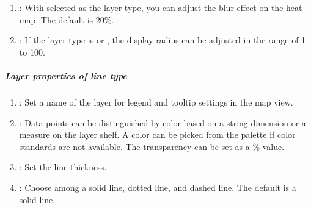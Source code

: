 \documentclass[letterpaper,10pt,english]{sphinxmanual}
\begin{document}
\begin{enumerate}
\item {} 
: With  selected as the layer type, you can adjust the blur effect on the heat map. The default is 20\%.

\item {} 
: If the layer type is  or , the display radius can be adjusted in the range of 1 to 100.

\end{enumerate}


\subparagraph{Layer properties of line type}
\label{\detokenize{discovery/part04/map_chart:line}}\begin{quote}

\begin{figure}[H]
\centering

\noindent{}
\end{figure}
\end{quote}
\begin{enumerate}
\def\theenumi{\arabic{enumi}}
\def\labelenumi{\theenumi .}
\makeatletter\def\p@enumii{\p@enumi \theenumi .}\makeatother
\item {} 
: Set a name of the layer for legend and tooltip settings in the map view.

\item {} 
: Data points can be distinguished by color based on a string dimension or a measure on the layer shelf. A color can be picked from the palette if color standards are not available. The transparency can be set as a \% value.

\item {} 
: Set the line thickness.

\item {} 
: Choose among a solid line, dotted line, and dashed line. The default is a solid line.

\end{enumerate}
\end{document}
